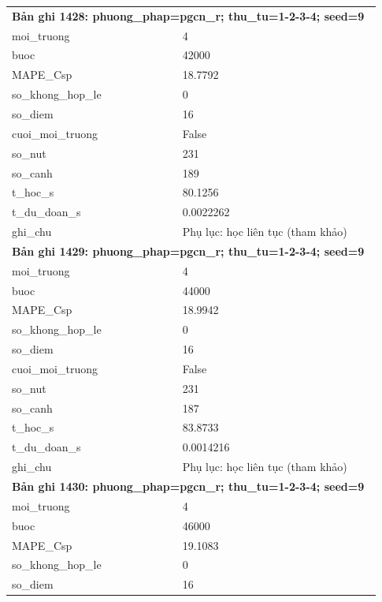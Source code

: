 \begin{longtable}{p{0.43\linewidth}p{0.50\linewidth}}
\midrule
\multicolumn{2}{p{0.95\linewidth}}{\textbf{Bản ghi 1428: phuong\_phap=pgcn\_r; thu\_tu=1-2-3-4; seed=9}} \\
moi\_\allowbreak truong & 4 \\
buoc & 42000 \\
MAPE\_\allowbreak Csp & 18.7792 \\
so\_\allowbreak khong\_\allowbreak hop\_\allowbreak le & 0 \\
so\_\allowbreak diem & 16 \\
cuoi\_\allowbreak moi\_\allowbreak truong & False \\
so\_\allowbreak nut & 231 \\
so\_\allowbreak canh & 189 \\
t\_\allowbreak hoc\_\allowbreak s & 80.1256 \\
t\_\allowbreak du\_\allowbreak doan\_\allowbreak s & 0.0022262 \\
ghi\_\allowbreak chu & Phụ lục: học liên tục (tham khảo) \\
\midrule
\multicolumn{2}{p{0.95\linewidth}}{\textbf{Bản ghi 1429: phuong\_phap=pgcn\_r; thu\_tu=1-2-3-4; seed=9}} \\
moi\_\allowbreak truong & 4 \\
buoc & 44000 \\
MAPE\_\allowbreak Csp & 18.9942 \\
so\_\allowbreak khong\_\allowbreak hop\_\allowbreak le & 0 \\
so\_\allowbreak diem & 16 \\
cuoi\_\allowbreak moi\_\allowbreak truong & False \\
so\_\allowbreak nut & 231 \\
so\_\allowbreak canh & 187 \\
t\_\allowbreak hoc\_\allowbreak s & 83.8733 \\
t\_\allowbreak du\_\allowbreak doan\_\allowbreak s & 0.0014216 \\
ghi\_\allowbreak chu & Phụ lục: học liên tục (tham khảo) \\
\midrule
\multicolumn{2}{p{0.95\linewidth}}{\textbf{Bản ghi 1430: phuong\_phap=pgcn\_r; thu\_tu=1-2-3-4; seed=9}} \\
moi\_\allowbreak truong & 4 \\
buoc & 46000 \\
MAPE\_\allowbreak Csp & 19.1083 \\
so\_\allowbreak khong\_\allowbreak hop\_\allowbreak le & 0 \\
so\_\allowbreak diem & 16 \\

\end{longtable}
